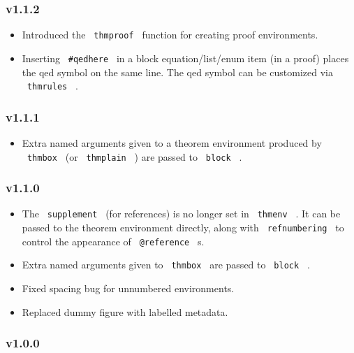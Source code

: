 \subsubsection{v1.1.2}\label{v1.1.2}

\begin{itemize}
\tightlist
\item
  Introduced the \texttt{\ thmproof\ } function for creating proof
  environments.
\item
  Inserting \texttt{\ \#qedhere\ } in a block equation/list/enum item
  (in a proof) places the qed symbol on the same line. The qed symbol
  can be customized via \texttt{\ thmrules\ } .
\end{itemize}

\subsubsection{v1.1.1}\label{v1.1.1}

\begin{itemize}
\tightlist
\item
  Extra named arguments given to a theorem environment produced by
  \texttt{\ thmbox\ } (or \texttt{\ thmplain\ } ) are passed to
  \texttt{\ block\ } .
\end{itemize}

\subsubsection{v1.1.0}\label{v1.1.0}

\begin{itemize}
\tightlist
\item
  The \texttt{\ supplement\ } (for references) is no longer set in
  \texttt{\ thmenv\ } . It can be passed to the theorem environment
  directly, along with \texttt{\ refnumbering\ } to control the
  appearance of \texttt{\ @reference\ } s.
\item
  Extra named arguments given to \texttt{\ thmbox\ } are passed to
  \texttt{\ block\ } .
\item
  Fixed spacing bug for unnumbered environments.
\item
  Replaced dummy figure with labelled metadata.
\end{itemize}

\subsubsection{v1.0.0}\label{v1.0.0}

